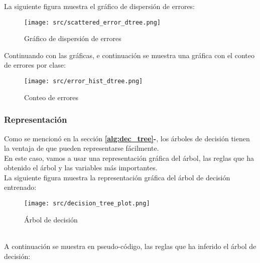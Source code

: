 La siguiente figura muestra el gráfico de dispersión de errores:
 \begin{figure}[!htbp]
	\centering
	\texttt{[image: src/scattered\_error\_dtree.png]}
	\caption{Gráfico de dispersión de errores}
	\label{fig:tree_scattered}
\end{figure}
Continuando con las gráficas, e continuación se muestra una gráfica con el conteo de errores por clase:
 \begin{figure}[!htbp]
	\centering
	\texttt{[image: src/error\_hist\_dtree.png]}
	\caption{Conteo de errores}
	\label{fig:tree_error_plot}
\end{figure}
\subsubsection{Representación}
Como se mencionó en la sección \textbf{\ref{alg:dec_tree}-}, los árboles de decisión tienen la ventaja de que pueden representarse fácilmente. \\
En este caso, vamos a usar una representación gráfica del árbol, las reglas que ha obtenido el árbol y las variables más importantes.\\
\linebreak
La siguiente figura muestra la representación gráfica del árbol de decisión entrenado:\\
\linebreak
 \begin{figure}[!htbp]
	\centering
	\texttt{[image: src/decision\_tree\_plot.png]}
	\caption{Árbol de decisión}
	\label{fig:decission_tree1}
\end{figure}
\\
A continuación se muestra en pseudo-código, las reglas que ha inferido el árbol de decisión:\\
\linebreak
